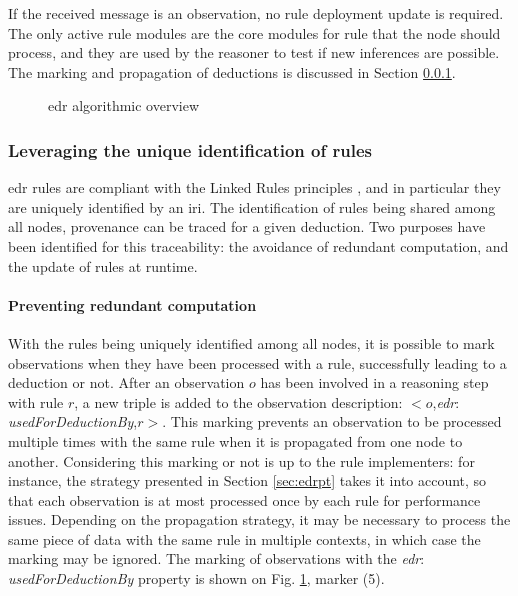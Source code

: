 \documentclass{iosart2c}
\newcommand{\namespace}[1]{\textit{#1$:$}}
\newcommand{\concept}[2]{\namespace{#1}\-\textit{#2}}
\newcommand{\triplet}[3]{$<$#1,\textit{#2},#3$>$}
\begin{document}
If the received message is an observation, no rule deployment update is required. 
The only active rule modules are the core modules for rule that the node should process, and they are used by the reasoner to test if new inferences are possible.
The marking and propagation of deductions is discussed in Section \textsection \ref{subsubs:unique_identification}.

\begin{figure}
	\centering
	\caption{\gls{edr} algorithmic overview}
	\label{fig:edr_algo}
	\scalebox{0.7}{
			
	}
\end{figure}

\subsubsection{Leveraging the unique identification of rules}
\label{subsubs:unique_identification}

\gls{edr} rules are compliant with the Linked Rules principles \cite{Khandelwal2011}, and in particular they are uniquely identified by an \gls{iri}.
The identification of rules being shared among all nodes, provenance can be traced for a given deduction.
Two purposes have been identified for this traceability: the avoidance of redundant computation, and the update of rules at runtime.

\paragraph{Preventing redundant computation} 

With the rules being uniquely identified among all nodes, it is possible to mark observations when they have been processed with a rule, successfully leading to a deduction or not.
After an observation $o$ has been involved in a reasoning step with rule $r$, a new triple is added to the observation description: \triplet{$o$}{\concept{edr}{used\-For\-Deduction\-By}}{$r$}.
This marking prevents an observation to be processed multiple times with the same rule when it is propagated from one node to another.
Considering this marking or not is up to the rule implementers: for instance, the strategy presented in Section \textsection \ref{sec:edrpt} takes it into account, so that each observation is at most processed once by each rule for performance issues.
Depending on the propagation strategy, it may be necessary to process the same piece of data with the same rule in multiple contexts, in which case the marking may be ignored.
The marking of observations with the \concept{edr}{used\-For\-Deduction\-By} property is shown on Fig. \ref{fig:edr_algo}, marker (5).
\end{document}
